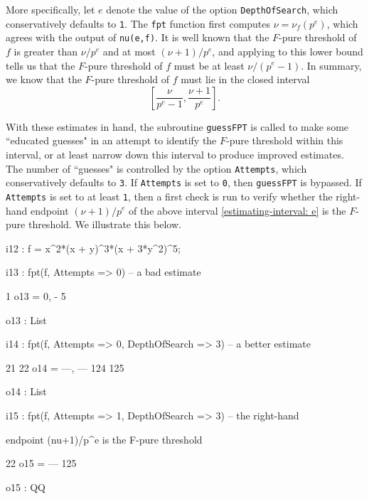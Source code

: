 \documentclass{amsart}
\begin{document}
More specifically, let $e$ denote the value of the option {\tt DepthOfSearch}, which conservatively defaults to {\tt 1}.  The {\tt fpt} function first computes $\nu=\nu_f(p^e)$, which agrees with the output of {\tt nu(e,f)}.  It is well known that the $F$-pure threshold of $f$ is greater than $\nu/p^e$ and at most $(\nu+1)/p^e$, and applying  \cite[Proposition 4.2]{HernandezFPurityOfHypersurfaces} to this lower bound tells us that the $F$-pure threshold of $f$ must be at least $\nu/(p^e-1)$.  In summary, we know that the $F$-pure threshold of $f$ must lie in the closed interval
%
\begin{equation}
\label{estimating-interval: e}
\tag{$\dagger$}
\left[ \frac{\nu}{p^e-1}, \frac{\nu+1}{p^e} \right].
\end{equation}

With these estimates in hand, the subroutine {\tt guessFPT} is called to make some ``educated guesses" in an attempt to identify the $F$-pure threshold within this interval, or at least narrow down this interval to produce improved estimates.  The number of ``guesses" is controlled by the option {\tt Attempts}, which conservatively defaults to {\tt 3}.  If {\tt Attempts} is set to {\tt 0}, then {\tt guessFPT} is bypassed. If  {\tt Attempts} is set to at least {\tt 1}, then a first check is run to verify whether the right-hand endpoint $(\nu+1)/p^e$ of the above interval \eqref{estimating-interval: e} is the $F$-pure threshold.  We illustrate this below.

\medspace
{\small
{}
\begin{MyVerbatim}

i12 : f = x^2*(x + y)^3*(x + 3*y^2)^5;

i13 : fpt(f, Attempts => 0) -- a bad estimate

          1
o13 = {0, -}
          5

o13 : List

i14 : fpt(f, Attempts => 0, DepthOfSearch => 3) -- a better estimate

        21   22
o14 = {---, ---}
       124  125

o14 : List

i15 : fpt(f, Attempts => 1, DepthOfSearch => 3) -- the right-hand

      endpoint (nu+1)/p^e is the F-pure threshold

       22
o15 = ---
      125

o15 : QQ

\end{MyVerbatim}
}
\end{document}
